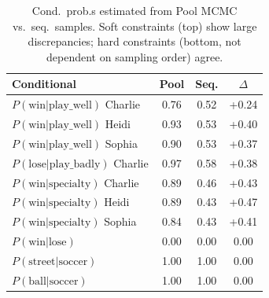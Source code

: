 \begin{table}[ht!]
\centering
\small
\begin{tabular}{@{}lccc@{}}
\toprule
\textbf{Conditional} & \textbf{Pool} & \textbf{Seq.} & \textbf{$\Delta$} \\
\midrule
$P(\text{win}|\text{play\_well})$ Charlie & 0.76 & 0.52 & +0.24 \\
$P(\text{win}|\text{play\_well})$ Heidi & 0.93 & 0.53 & +0.40 \\
$P(\text{win}|\text{play\_well})$ Sophia & 0.90 & 0.53 & +0.37 \\
$P(\text{lose}|\text{play\_badly})$ Charlie & 0.97 & 0.58 & +0.38 \\
$P(\text{win}|\text{specialty})$ Charlie & 0.89 & 0.46 & +0.43 \\
$P(\text{win}|\text{specialty})$ Heidi & 0.89 & 0.43 & +0.47 \\
$P(\text{win}|\text{specialty})$ Sophia & 0.84 & 0.43 & +0.41 \\
\midrule
$P(\text{win}|\text{lose})$ & 0.00 & 0.00 & 0.00 \\
$P(\text{street}|\text{soccer})$ & 1.00 & 1.00 & 0.00 \\
$P(\text{ball}|\text{soccer})$ & 1.00 & 1.00 & 0.00 \\
\bottomrule
\end{tabular}
\vspace{-0.5em}
\caption{\small Cond.\ prob.s estimated from Pool MCMC vs.\ seq.\ samples. Soft constraints (top) show large discrepancies; hard constraints (bottom, not dependent on sampling order) agree.}
\label{tab:sampling-comparison}
\end{table}
